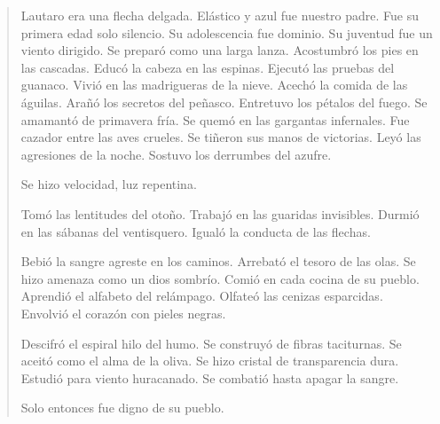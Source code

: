 \documentclass[12pt]{article}
\begin{document}
\clearpage
{}
\begin{verse}
Lautaro era una flecha delgada.  
Elástico y azul fue nuestro padre.  
Fue su primera edad solo silencio.  
Su adolescencia fue dominio.  
Su juventud fue un viento dirigido.  
Se preparó como una larga lanza.  
Acostumbró los pies en las cascadas.  
Educó la cabeza en las espinas.  
Ejecutó las pruebas del guanaco.  
Vivió en las madrigueras de la nieve.  
Acechó la comida de las águilas.  
Arañó los secretos del peñasco.  
Entretuvo los pétalos del fuego.  
Se amamantó de primavera fría.  
Se quemó en las gargantas infernales.  
Fue cazador entre las aves crueles.  
Se tiñeron sus manos de victorias.  
Leyó las agresiones de la noche.  
Sostuvo los derrumbes del azufre.  
	
Se hizo velocidad, luz repentina.  
	
Tomó las lentitudes del otoño.  
Trabajó en las guaridas invisibles.  
Durmió en las sábanas del ventisquero.  
Igualó la conducta de las flechas.  
	
Bebió la sangre agreste en los caminos.  
Arrebató el tesoro de las olas.  
Se hizo amenaza como un dios sombrío.  
Comió en cada cocina de su pueblo.  
Aprendió el alfabeto del relámpago.  
Olfateó las cenizas esparcidas.  
Envolvió el corazón con pieles negras.  
	
Descifró el espiral hilo del humo.  
Se construyó de fibras taciturnas.  
Se aceitó como el alma de la oliva.  
Se hizo cristal de transparencia dura.  
Estudió para viento huracanado.  
Se combatió hasta apagar la sangre.  
	
Solo entonces fue digno de su pueblo.  

\end{verse}
\end{document}
